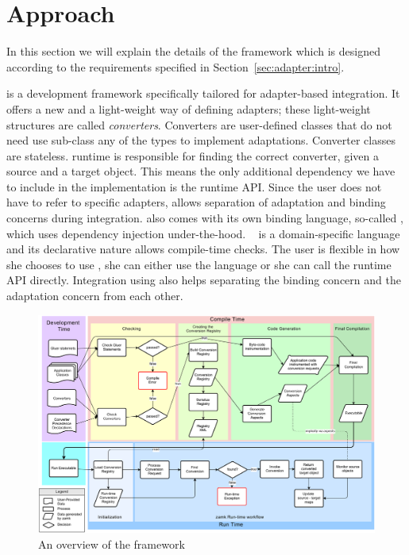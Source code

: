 \section{Approach}
\label{sec:adapter:approach}
In this section we will explain the details of the \zamk framework which is designed according to the requirements specified in Section~\ref{sec:adapter:intro}. 

\zamk is a development framework specifically tailored for adapter-based integration. 
It offers a new and a light-weight way of defining adapters; these light-weight structures are called \emph{converters}. 
Converters are user-defined classes that do not need use sub-class any of the types to implement adaptations. Converter classes are stateless. 
\zamk runtime is responsible for finding the correct converter, given a source and a target object. 
This means the only additional dependency we have to include in the implementation is the \zamk runtime API. 
Since the user does not have to refer to specific adapters, \zamk allows separation of adaptation and binding concerns during integration.
\zamk also comes with its own binding language, so-called \gluer, which uses dependency injection under-the-hood. 
\gluer~ is a domain-specific language and its declarative nature allows compile-time checks.
The user is flexible in how she chooses to use \zamk, she can either use the \gluer language or she can call the runtime API directly. 
Integration using \zamk also helps separating the binding concern and the adaptation concern from each other.  

\begin{figure}
\includegraphics[height=\textwidth, angle=90]{chapteradapters/bigpicture.pdf}
\caption{An overview of the \zamk framework}
\label{fig:framework}
\end{figure}

